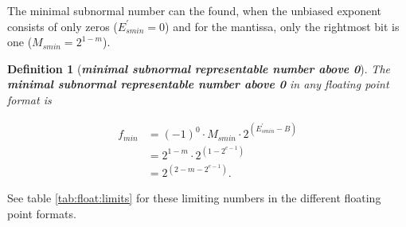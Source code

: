 \documentclass{article}
\theoremstyle{plain} %
\newtheorem{definition}{Definition}[section]
\theoremstyle{remark} %
\def\df#1{\textbf{\textit{#1}}}
\numberwithin{equation}{section}
\begin{document}
The minimal subnormal number can the found, when the unbiased exponent consists of only zeros ($E^{\prime}_{smin} = 0$) and for the mantissa, only the rightmost bit is one ($M_{smin} = 2^{1-m}$).

\begin{definition}[\df{minimal subnormal representable number above \num{0}}]

The \df{minimal subnormal representable number above \num{0}} in any floating point format is

\begin{align*}
    f_{min} &= (-1)^0 \cdot M_{smin} \cdot 2^{(E^{\prime}_{smin} - B)} \\
            &= 2^{1-m} \cdot 2^{(1 - 2^{e-1})} \\
            &= 2^{(2 -m -2^{e-1})}.
\end{align*}

\end{definition}

See table \ref{tab:float:limits} for these limiting numbers in the different floating point formats.
\end{document}
